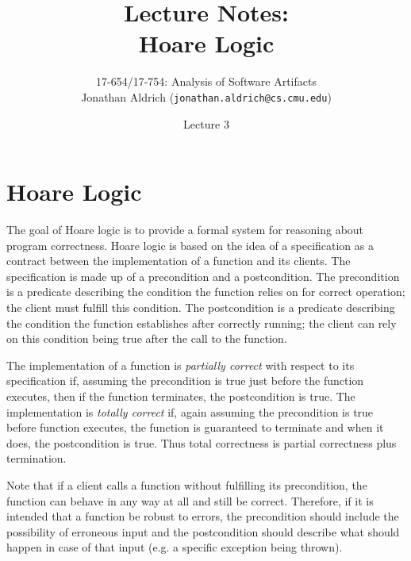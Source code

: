 \documentclass[11pt]{article}
\title{Lecture Notes:\\
    Hoare Logic}
\author{17-654/17-754: Analysis of Software Artifacts \\
    Jonathan Aldrich ({\tt jonathan.aldrich@cs.cmu.edu})}
\date{Lecture 3}
\begin{document}
    \newtheorem{theorem}{Theorem}
    \newtheorem{lemma}[theorem]{Lemma}

    \maketitle


    \newcommand{\pfalse}{\mbox{false}}
    \newcommand{\ptrue}{\mbox{true}}
    \newcommand{\pand}{\mbox{and}}
    \newcommand{\por}{\mbox{or}}
    \newcommand{\pskip}{\mbox{skip}}
    \newcommand{\pif}{\mbox{if}}
    \newcommand{\pthen}{\mbox{then}}
    \newcommand{\pelse}{\mbox{else}}
    \newcommand{\pdo}{\mbox{do}}
    \newcommand{\pwhile}{\mbox{while}}

    \newcommand{\mtrue}{\mathbf{true}}
    \newcommand{\mfalse}{\mathbf{false}}


    \section{Hoare Logic}

    The goal of Hoare logic is to provide a formal system for reasoning
    about program correctness. Hoare logic is based on the idea of a
    specification as a contract between the implementation of a function
    and its clients. The specification is made up of a precondition and a
    postcondition. The precondition is a predicate describing the
    condition the function relies on for correct operation; the client
    must fulfill this condition. The postcondition is a predicate
    describing the condition the function establishes after correctly
    running; the client can rely on this condition being true after
    the call to the function.

    The implementation of a function is \textit{partially correct} with
    respect to its specification if, assuming the precondition is true
    just before the function executes, then if the function terminates,
    the postcondition is true. The implementation is \textit{totally
    correct} if, again assuming the precondition is true before function
    executes, the function is guaranteed to terminate and when it does,
    the postcondition is true. Thus total correctness is partial correctness
    plus termination.

    Note that if a client calls a function without fulfilling its
    precondition, the function can behave in any way at all and still be
    correct. Therefore, if it is intended that a function be robust to
    errors, the precondition should include the possibility of erroneous
    input and the postcondition should describe what should happen in case
    of that input (e.g. a specific exception being thrown).
\end{document}
